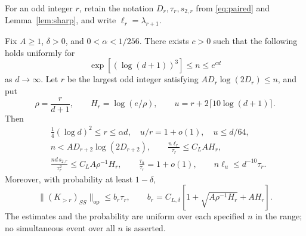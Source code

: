 For an odd integer $r$, retain the notation $D_r,\tau_r,s_{2,r}$
from \eqref{eq:paired} and Lemma~\ref{lem:sharp}, and write
$\ell_r=\lambda_{r+1}$.

\begin{lemma}
\label{lem:adaptive-cutoff}
Fix $A\ge1$, $\delta>0$, and $0<\alpha<1/256$.
There exists $c>0$ such that the following holds uniformly for
\[
 \exp[(\log(d+1))^3]\le n\le e^{cd}
\]
as $d\to\infty$. Let $r$ be the largest odd integer satisfying
$A D_r\log(2D_r)\le n$, and put
\[
 \rho=\frac r{d+1},\qquad H_r=\log(e/\rho),\qquad
 u=r+2\lceil10\log(d+1)\rceil.
\]
Then
\begin{align}
 &\tfrac14(\log d)^2\le r\le\alpha d,\quad
 u/r=1+o(1),\quad u\le d/64,\label{eq:adaptive-range}\\
 &n<A D_{r+2}\log(2D_{r+2}),\qquad
 \frac{n\ell_r}{\tau_r}\le C_L A H_r,\label{eq:adaptive-ell}\\
 &\frac{nd\,s_{2,r}}{\tau_r^2}\le C_L A\rho^{-1}H_r,
 \qquad \frac{\tau_u}{\tau_r}=1+o(1),
 \qquad n\ell_u\le d^{-10}\tau_r.\label{eq:adaptive-tail}
\end{align}
Moreover, with probability at least $1-\delta$,
\begin{equation}\label{eq:adaptive-gram}
 \|(K_{>r})_{SS}\|_{\mathrm{op}}\le b_r\tau_r,
 \qquad b_r=C_{L,\delta}
     \left[1+\sqrt{A\rho^{-1}H_r}+A H_r\right].
\end{equation}
The estimates and the probability are uniform over each specified
$n$ in the range; no simultaneous event over all $n$ is asserted.
\end{lemma}
